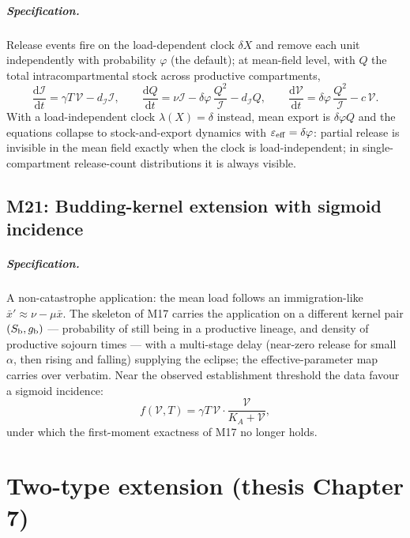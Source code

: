 \documentclass[11pt,a4paper]{report}
\newcommand{\dd}{\mathrm{d}}
\newcommand{\ddt}[1]{\frac{\dd #1}{\dd t}}
\newcommand{\Act}{\mathcal{I}}     %
\newcommand{\Free}{\mathcal{V}}    %
\newcommand{\source}[1]{\par\noindent{\small\textit{Specified in #1.}}\par\medskip}
\begin{document}
\paragraph{Specification.} Release events fire on the load-dependent clock
$\delta X$ and remove each unit independently with probability $\varphi$
(the default); at mean-field level, with $Q$ the total intracompartmental
stock across productive compartments,
\begin{equation}
\ddt{\Act}=\gamma T\,\Free-d_{\Act}\Act,
\qquad
\ddt{Q}=\nu\Act-\delta\varphi\,\frac{Q^2}{\Act}-d_{\Act}Q,
\qquad
\ddt{\Free}=\delta\varphi\,\frac{Q^2}{\Act}-c\,\Free.
\end{equation}
With a load-independent clock $\lambda(X)=\delta$ instead, mean export is
$\delta\varphi Q$ and the equations collapse to stock-and-export dynamics
with $\varepsilon_{\rm eff}=\delta\varphi$: partial release is invisible in
the mean field exactly when the clock is load-independent; in single-compartment
release-count distributions it is always visible.

\section{M21: Budding-kernel extension with sigmoid incidence}
\source{\S6.7.3}

\paragraph{Specification.} A non-catastrophe application: the mean load
follows an immigration-like $\bar x'\approx\nu-\mu\bar x$. The skeleton of
M17 carries the application on a different kernel pair $(S_{\rm b},g_{\rm
b})$ --- probability of still being in a productive lineage, and density of
productive sojourn times --- with a multi-stage delay (near-zero release for
small $\alpha$, then rising and falling) supplying the eclipse; the
effective-parameter map carries over verbatim. Near the observed
establishment threshold the data favour a sigmoid incidence:
\begin{equation}
f(\Free,T)=\gamma T\,\Free\cdot\frac{\Free}{K_A+\Free},
\end{equation}
under which the first-moment exactness of M17 no longer holds.

\chapter{Two-type extension (thesis Chapter 7)}
\end{document}

